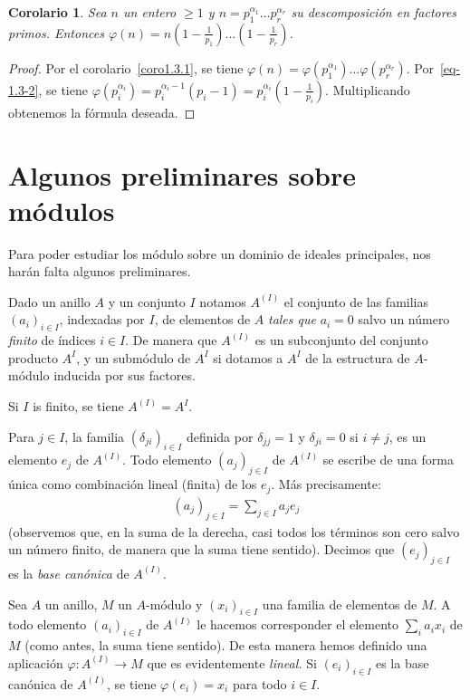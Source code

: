 \documentclass[10pt,oneside,bibtotoc,smallheadings,leqno,a5paper,DIV=12]{scrbook}
\renewcommand{\to}[1][]{\xrightarrow{#1}}
\numberwithin{equation}{section}
\theoremstyle{defi}
\theoremstyle{enonce}
\newtheorem{corollary}{Corolario}
\theoremstyle{rem}
\numberwithin{theorem}{section}
\numberwithin{proposition}{section}
\numberwithin{definition}{section}
\numberwithin{lemma}{section}
\numberwithin{corollary}{section}
\numberwithin{example}{section}
\numberwithin{footnote}{section}%
\begin{document}
\begin{corollary}
Sea $n$ un entero $\geq 1$ y $n = p_{1}^{\alpha_{1}}\dots p_{r}^{\alpha_{r}}$ su
descomposici\'on
en factores primos. Entonces
$\varphi(n) = n\left(1-\frac{1}{p_{1}}\right)\dots\left(1-\frac{1}{p_{r}}\right)$.
\end{corollary}

\begin{proof}
Por el corolario~\ref{coro1.3.1}, se tiene
$\varphi(n) = \varphi(p_{1}^{\alpha_{1}})\dots\varphi(p_{r}^{\alpha_{r}})$.
Por~\eqref{eq-1.3-2}, se tiene $\varphi(p_{i}^{\alpha_{i}}) = p_{i}^{\alpha_{i}-1}(p_{i}-1)
=p_{i}^{\alpha_{i}}\left(1-\frac{1}{p_{i}}\right)$. Multiplicando obtenemos
la f\'ormula deseada.
\end{proof}

\section{Algunos preliminares sobre m\'odulos}\label{sec1.4}

Para poder estudiar los m\'odulo sobre un dominio de ideales principales, nos har\'an
falta algunos preliminares.

Dado un anillo $A$ y un conjunto $I$ notamos $A^{(I)}$ el conjunto de las
familias $(a_{i})_{i\in I}$,
indexadas por $I$, de elementos de $A$ {\em tales que} $a_{i} = 0$ salvo un
n\'umero {\em finito} de \'indices
$i\in I$. De manera que $A^{(I)}$ es un subconjunto del conjunto producto $A^{I}$,
y un subm\'odulo de $A^{I}$ si
dotamos a $A^{I}$ de la estructura de $A$-m\'odulo inducida por sus factores.

Si $I$ is finito, se tiene $A^{(I)} = A^{I}$.

Para $j\in I$, la familia $(\delta_{ji})_{i\in I}$ definida por
$\delta_{jj} = 1$ y $\delta_{ji} = 0$ si
$i\neq j$, es un elemento $e_{j}$ de $A^{(I)}$. Todo elemento $(a_{j})_{j\in I}$
de $A^{(I)}$ se escribe
de una forma \'unica como combinaci\'on lineal (finita) de los $e_{j}$. M\'as precisamente:
\begin{gather}
(a_{j})_{j\in I} = \sum_{j\in I}a_{j}e_{j}
\end{gather}
(observemos que, en la suma de la derecha, casi todos los t\'erminos son cero salvo un
n\'umero finito, de manera
que la suma tiene sentido). Decimos que $(e_{j})_{j\in I}$ es la
{\em base can\'onica} de $A^{(I)}$.

Sea $A$ un anillo, $M$ un $A$-m\'odulo y $(x_{i})_{i\in I}$ una familia de elementos
de $M$. A todo elemento
$(a_{i})_{i\in I}$ de $A^{(I)}$ le hacemos corresponder el elemento $\sum_{i}a_{i}x_{i}$
de $M$ (como antes, la
suma tiene sentido). De esta manera hemos definido una aplicaci\'on
$\varphi:A^{(I)}\to M$ que es evidentemente
{\em lineal.} Si $(e_{i})_{i\in I}$ es la base can\'onica de $A^{(I)}$, se
tiene $\varphi(e_{i}) = x_{i}$ para todo
$i\in I$.
\end{document}

